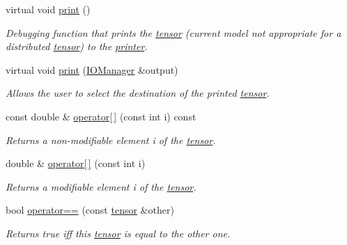 \begin{DoxyCompactItemize}
virtual void \hyperlink{classJKBuilder_1_1tensor_a388f572c62279f839ee138a9afbdeeb5}{print} ()
\begin{DoxyCompactList}\small\item\em Debugging function that prints the \hyperlink{classJKBuilder_1_1tensor}{tensor} (current model not appropriate for a distributed \hyperlink{classJKBuilder_1_1tensor}{tensor}) to the \hyperlink{classJKBuilder_1_1printer}{printer}. \item\end{DoxyCompactList}\item 
virtual void \hyperlink{classJKBuilder_1_1tensor_a74b2fe351a5444c1325870dc6162f451}{print} (\hyperlink{classJKBuilder_1_1IOManager}{IOManager} \&output)
\begin{DoxyCompactList}\small\item\em Allows the user to select the destination of the printed \hyperlink{classJKBuilder_1_1tensor}{tensor}. \item\end{DoxyCompactList}\item 
const double \& \hyperlink{classJKBuilder_1_1tensor_a4f0dc1b84b580cec49500c70f87e084a}{operator\mbox{[}$\,$\mbox{]}} (const int i) const 
\begin{DoxyCompactList}\small\item\em Returns a non-\/modifiable element i of the \hyperlink{classJKBuilder_1_1tensor}{tensor}. \item\end{DoxyCompactList}\item 
double \& \hyperlink{classJKBuilder_1_1tensor_a38c9fed6b117f7cf8b76785648d76b62}{operator\mbox{[}$\,$\mbox{]}} (const int i)
\begin{DoxyCompactList}\small\item\em Returns a modifiable element i of the \hyperlink{classJKBuilder_1_1tensor}{tensor}. \item\end{DoxyCompactList}\item 
bool \hyperlink{classJKBuilder_1_1tensor_a10ae0b61e655854d12c6465d2b9e3506}{operator==} (const \hyperlink{classJKBuilder_1_1tensor}{tensor} \&other)
\begin{DoxyCompactList}\small\item\em Returns true iff this \hyperlink{classJKBuilder_1_1tensor}{tensor} is equal to the other one. \item\end{DoxyCompactList}\item 

\end{DoxyCompactItemize}
